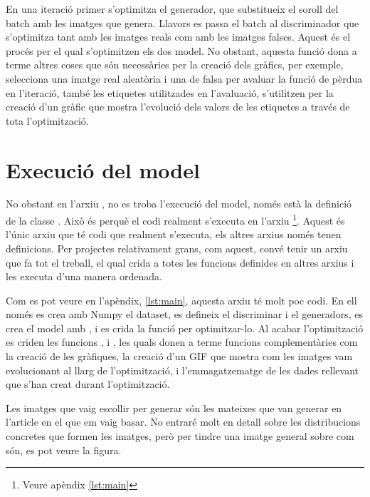 En una iteració primer s'optimitza el generador, que substitueix el soroll del batch amb les imatges que genera. Llavors es passa el batch al discriminador que s'optimitza tant amb les imatges reals com amb les imatges falses. Aquest és el procés per el qual s'optimitzen els dos model. No obstant, aquesta funció dona a terme altres coses que són necessàries per la creació dels gràfics, per exemple, selecciona una imatge real aleatòria i una de falsa per avaluar la funció de pèrdua en l'iteració, també les etiquetes utilitzades en l'avaluació, s'utilitzen per la creació d'un gràfic que mostra l'evolució dels valors de les etiquetes a través de tota l'optimització. 

\section{Execució del model}

No obstant en l'arxiu , no es troba l'execució del model, només està la definició de la classe . Això és perquè el codi realment s'executa en l'arxiu \footnote{Veure apèndix \ref{lst:main}}. Aquest és l'únic arxiu que té codi que realment s'executa, els altres arxius només tenen definicions. Per projectes relativament grans, com aquest, convé tenir un arxiu que fa tot el treball, el qual crida a totes les funcions definides en altres arxius i les executa d'una manera ordenada. 

Com es pot veure en l'apèndix, \ref{lst:main}, aquesta arxiu té molt poc codi. En ell només es crea amb Numpy el dataset, es defineix el discriminar i el generadors, es crea el model amb , i es crida la funció  per optimitzar-lo. Al acabar l'optimització es criden les funcions ,  i , les quals donen a terme funcions complementàries com la creació de les gràfiques, la creació d'un GIF que mostra com les imatges vam evolucionant al llarg de l'optimització, i l'emmagatzematge de les dades rellevant que s'han creat durant l'optimització.  

Les imatges que vaig escollir per generar són les mateixes que van generar en l'article en el que em vaig basar. No entraré molt en detall sobre les distribucions concretes que formen les imatges, però per tindre una imatge general sobre com són, es pot veure la figura.

